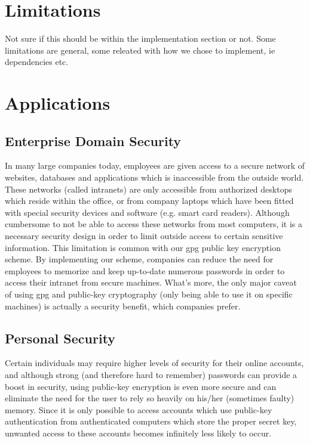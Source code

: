 \documentclass[11pt]{article}
\begin{document}
\section{Limitations} \label{sec:limitations}
Not sure if this should be within the implementation section or not. Some limitations are general, some releated with how we chose to implement, ie dependencies etc.

\section{Applications} \label{sec:applications}
\subsection{Enterprise Domain Security} \label{subsec:enterprisedomainsecurity}
In many large companies today, employees are given access to a secure network of websites, databases and applications which is inaccessible from the outside world.  These networks (called intranets) are only accessible from authorized desktops which reside within the office, or from company laptops which have been fitted with special security devices and software (e.g. smart card readers).  Although cumbersome to not be able to access these networks from most computers, it is a necessary security design in order to limit outside access to certain sensitive information.  This limitation is common with our gpg public key encryption scheme.  By implementing our scheme, companies can reduce the need for employees to memorize and keep up-to-date numerous passwords in order to access their intranet from secure machines.  What's more, the only major caveat of using gpg and public-key cryptography (only being able to use it on specific machines) is actually a security benefit, which companies prefer.

\subsection{Personal Security} \label{subsec:personalsecurity}
Certain individuals may require higher levels of security for their online accounts, and although strong (and therefore hard to remember) passwords can provide a boost in security, using public-key encryption is even more secure and can eliminate the need for the user to rely so heavily on his/her (sometimes faulty) memory.  Since it is only possible to access accounts which use public-key authentication from authenticated computers which store the proper secret key, unwanted access to these accounts becomes infinitely less likely to occur.
\end{document}
